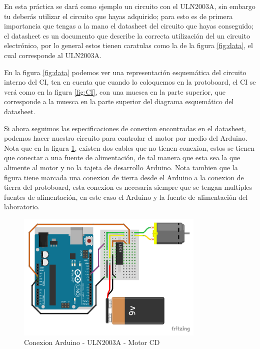		En esta práctica se dará como ejemplo un circuito con el ULN2003A, sin embargo tu deberás utilizar el circuito que hayas adquirido; para esto es de primera importancia que tengas a la mano el datasheet del circuito que hayas conseguido; el datasheet es un documento que describe la correcta utilización del un circuito electrónico, por lo general estos tienen caratulas como la de la figura \ref{fig:data}, el cual corresponde al ULN2003A.

		En la figura \ref{fig:data} podemos ver una representación esquemática del circuito interno del CI, ten en cuenta que cuando lo coloquemos en la protoboard, el CI se verá como en la figura \ref{fig:CI}, con una muesca en la parte superior, que corresponde a la muesca en la parte superior del diagrama esquemático del datasheet.

		Si ahora seguimos las especificaciones de conexion encontradas en el datasheet, podemos hacer nuestro circuito para controlar el motor por medio del Arduino. Nota que en la figura \ref{fig:motor_arduino}, existen dos cables que no tienen conexion, estos se tienen que conectar a una fuente de alimentación, de tal manera que esta sea la que alimente al motor y no la tajeta de desarrollo Arduino. Nota tambien que la figura tiene marcada una conexion de tierra desde el Arduino a la conexion de tierra del protoboard, esta conexion es necesaria siempre que se tengan multiples fuentes de alimentación, en este caso el Arduino y la fuente de alimentación del laboratorio.

		\begin{figure}
			\begin{center}
				\includegraphics[width=0.8\textwidth]{images/Arduino-L293D-CD.pdf}
				\caption{Conexion Arduino - ULN2003A - Motor CD}
				\label{fig:motor_arduino}
			\end{center}
		\end{figure}

